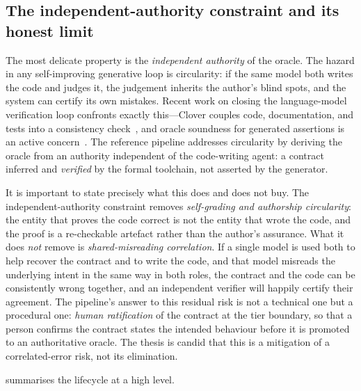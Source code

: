 \subsection{The independent-authority constraint and its honest limit}

The most delicate property is the \emph{independent authority} of the oracle. The
hazard in any self-improving generative loop is circularity: if the same model
both writes the code and judges it, the judgement inherits the author's blind
spots, and the system can certify its own mistakes. Recent work on closing the
language-model verification loop confronts exactly this---Clover couples code,
documentation, and tests into a consistency check~\citep{sun2024clover}, and oracle
soundness for generated assertions is an active concern~\citep{liu2026oracle}. The
reference pipeline addresses circularity by deriving the oracle from an authority
independent of the code-writing agent: a contract inferred and \emph{verified} by
the formal toolchain, not asserted by the generator.

It is important to state precisely what this does and does not buy. The
independent-authority constraint removes \emph{self-grading and authorship
circularity}: the entity that proves the code correct is not the entity that wrote
the code, and the proof is a re-checkable artefact rather than the author's
assurance. What it does \emph{not} remove is \emph{shared-misreading correlation}.
If a single model is used both to help recover the contract and to write the code,
and that model misreads the underlying intent in the same way in both roles, the
contract and the code can be consistently wrong together, and an independent
verifier will happily certify their agreement. The pipeline's answer to this
residual risk is not a technical one but a procedural one: \emph{human
ratification} of the contract at the tier boundary, so that a person confirms the
contract states the intended behaviour before it is promoted to an authoritative
oracle. The thesis is candid that this is a mitigation of a correlated-error risk,
not its elimination.

 summarises the lifecycle at a high level.

